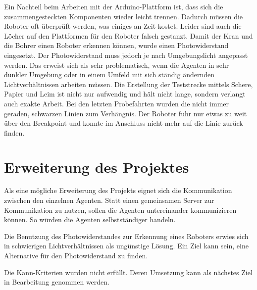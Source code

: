 Ein Nachteil beim Arbeiten mit der Arduino-Plattform ist, dass sich die zusammengesteckten Komponenten wieder leicht trennen. Dadurch müssen die Roboter oft überprüft werden, was einiges an Zeit kostet. Leider sind auch die Löcher auf den Plattformen für den Roboter falsch gestanzt. Damit der Kran und die Bohrer einen Roboter erkennen können, wurde einen Photowiderstand eingesetzt. Der Photowiderstand muss jedoch je nach Umgebungslicht angepasst werden. Das erweist sich als sehr problematisch, wenn die Agenten in sehr dunkler Umgebung oder in einem Umfeld mit sich ständig ändernden Lichtverhältnissen arbeiten müssen. Die Erstellung der Teststrecke mittels Schere, Papier und Leim ist nicht nur aufwendig und hält nicht lange, sondern verlangt auch exakte Arbeit. Bei den letzten Probefahrten wurden die nicht immer geraden, schwarzen Linien zum Verhängnis. Der Roboter fuhr nur etwas zu weit über den Breakpoint und konnte im Anschluss nicht mehr auf die Linie zurück finden.

\section{Erweiterung des Projektes}

Als eine mögliche Erweiterung des Projekts eignet sich die Kommunikation zwischen den einzelnen Agenten. Statt einen gemeinsamen Server zur Kommunikation zu nutzen, sollen die Agenten untereinander kommunizieren können. So würden die Agenten selbstständiger handeln.

Die Benutzung des Photowiderstandes zur Erkennung eines Roboters erwies sich in schwierigen Lichtverhältnissen als ungünstige Lösung. Ein Ziel kann sein, eine Alternative für den Photowiderstand zu finden.

Die Kann-Kriterien wurden nicht erfüllt. Deren Umsetzung kann als nächstes Ziel in Bearbeitung genommen werden.
